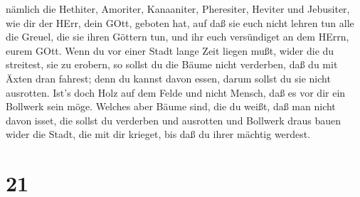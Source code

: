 nämlich die Hethiter, Amoriter, Kanaaniter, Pheresiter, Heviter und
Jebusiter, wie dir der HErr, dein GOtt, geboten hat,  auf
daß sie euch nicht lehren tun alle die Greuel, die sie ihren Göttern
tun, und ihr euch versündiget an dem HErrn, eurem GOtt. 
Wenn du vor einer Stadt lange Zeit liegen mußt, wider die du streitest,
sie zu erobern, so sollst du die Bäume nicht verderben, daß du mit Äxten
dran fahrest; denn du kannst davon essen, darum sollst du sie nicht
ausrotten. Ist's doch Holz auf dem Felde und nicht Mensch, daß es vor
dir ein Bollwerk sein möge.  Welches aber Bäume sind, die
du weißt, daß man nicht davon isset, die sollst du verderben und
ausrotten und Bollwerk draus bauen wider die Stadt, die mit dir krieget,
bis daß du ihrer mächtig werdest.

\hypertarget{section-20}{%
\section{21}\label{section-20}}

